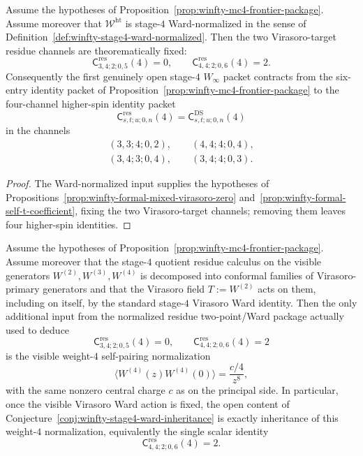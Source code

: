 \begin{corollary}
\label{cor:winfty-stage4-residue-four-channel}
Assume the hypotheses of
Proposition~\ref{prop:winfty-mc4-frontier-package}.  Assume moreover
that $\mathcal{W}^{\mathrm{ht}}$ is stage-$4$ Ward-normalized in the
sense of Definition~\ref{def:winfty-stage4-ward-normalized}.  Then the
two
Virasoro-target residue channels are theorematically fixed:
\[
\mathsf{C}^{\mathrm{res}}_{3,4;2;0,5}(4)=0,
\qquad
\mathsf{C}^{\mathrm{res}}_{4,4;2;0,6}(4)=2.
\]
Consequently the first genuinely open stage-$4$
\texorpdfstring{$W_\infty$}{W_infty} packet contracts from the six-entry
identity packet of Proposition~\ref{prop:winfty-mc4-frontier-package} to
the four-channel higher-spin identity packet
\[
\mathsf{C}^{\mathrm{res}}_{s,t;u;0,n}(4)
=
\mathsf{C}^{\mathrm{DS}}_{s,t;u;0,n}(4)
\]
in the channels
\[
\begin{gathered}
(3,3;4;0,2),\qquad
(4,4;4;0,4),\\
(3,4;3;0,4),\qquad
(3,4;4;0,3).
\end{gathered}
\]
\end{corollary}

\begin{proof}
The Ward-normalized input supplies the hypotheses of Propositions~\ref{prop:winfty-formal-mixed-virasoro-zero} and~\ref{prop:winfty-formal-self-t-coefficient}, fixing the two Virasoro-target channels; removing them leaves four higher-spin identities.
\end{proof}

\begin{proposition}
\label{prop:winfty-stage4-visible-pairing-gap}
Assume the hypotheses of
Proposition~\ref{prop:winfty-mc4-frontier-package}.  Assume moreover
that the stage-$4$ quotient residue calculus on the visible generators
$W^{(2)},W^{(3)},W^{(4)}$ is decomposed into conformal families of
Virasoro-primary generators and that the Virasoro field $T:=W^{(2)}$
acts on them, including on itself, by the standard stage-$4$
Virasoro Ward identity.  Then the only additional input from the
normalized residue two-point/Ward package actually used to deduce
\[
\mathsf{C}^{\mathrm{res}}_{3,4;2;0,5}(4)=0,
\qquad
\mathsf{C}^{\mathrm{res}}_{4,4;2;0,6}(4)=2
\]
is the visible weight-$4$ self-pairing normalization
\[
\langle W^{(4)}(z)W^{(4)}(0)\rangle=\frac{c/4}{z^{8}},
\]
with the same nonzero central charge $c$ as on the principal side.
In particular, once the visible Virasoro Ward action is fixed, the open
content of Conjecture~\ref{conj:winfty-stage4-ward-inheritance} is
exactly inheritance of this weight-$4$ normalization, equivalently the
single scalar identity
\[
\mathsf{C}^{\mathrm{res}}_{4,4;2;0,6}(4)=2.
\]
\end{proposition}

